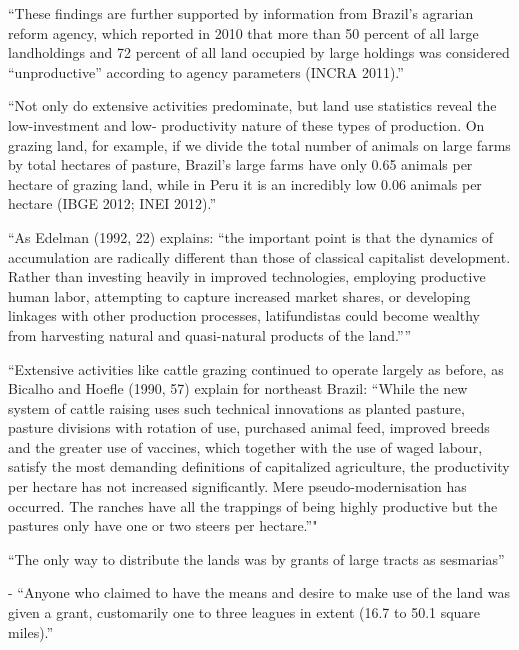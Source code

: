 \documentclass{article}
\begin{document}
\parencite{Carlson2019-mk}
``These findings are further supported by information from Brazil’s agrarian reform 
agency, which reported in 2010 that more than 50 percent of all large landholdings and 72 percent of all  land  occupied  by  large  holdings  was  considered  “unproductive”  according  to  agency  parameters  (INCRA   2011).''

\parencite{Carlson2019-mk}
``Not only do extensive activities predominate, but land use statistics reveal the low-investment and low- productivity nature of these types of production. On grazing land, for example, if we divide the total number  of animals on large farms by total hectares of pasture, Brazil’s large farms have only 0.65 animals per hectare  of grazing land, while in Peru it is an incredibly low 0.06 animals per hectare (IBGE 2012; INEI 2012).''

\parencite{Carlson2019-mk}
``As Edelman (1992, 22) explains: “the important point is that the dynamics of accumulation are 
radically different than those of classical capitalist development. Rather than investing heavily in improved  technologies,  employing  productive  human  labor,  attempting  to  capture  increased  market  shares,  or   developing linkages with other production processes, latifundistas could become wealthy from harvesting  natural and quasi-natural products of the land.”''

\parencite{Carlson2019-mk} ``Extensive  activities  like  
cattle grazing continued to operate largely as before, as Bicalho and Hoefle (1990, 57) explain for northeast  Brazil: “While the new system of cattle raising uses such technical innovations as planted pasture, pasture  divisions with rotation of use, purchased animal feed, improved breeds and the greater use of vaccines, which  together  with  the  use  of  waged  labour,  satisfy  the  most  demanding  definitions  of  capitalized  agriculture,   the productivity per hectare has not increased significantly. Mere pseudo-modernisation has occurred. The  ranches have all the trappings of being highly productive but the pastures only have one or two steers per  hectare.”"

\textcite{Diegues_Junior1959-ba}

\textcite{Smith1944-oi} ``The only way to distribute the lands was by grants of large tracts as sesmarias''

\textcite{Dean1971-iq} - ``Anyone who claimed to have the means and desire to make use of the land was given a grant, customarily one to three leagues in extent (16.7 to 50.1 square miles).''
\end{document}
